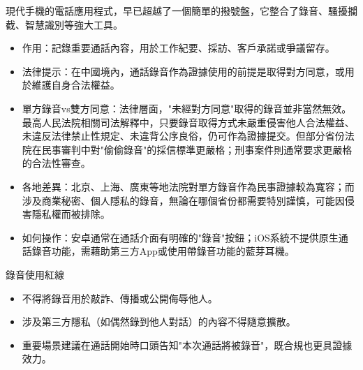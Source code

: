


現代手機的電話應用程式，早已超越了一個簡單的撥號盤，它整合了錄音、騷擾攔截、智慧識別等強大工具。


\begin{itemize}
  \item 作用：記錄重要通話內容，用於工作紀要、採訪、客戶承諾或爭議留存。
  \item 法律提示：在中國境內，通話錄音作為證據使用的前提是取得對方同意，或用於維護自身合法權益。
  \item 單方錄音vs雙方同意：法律層面，"未經對方同意"取得的錄音並非當然無效。最高人民法院相關司法解釋中，只要錄音取得方式未嚴重侵害他人合法權益、未違反法律禁止性規定、未違背公序良俗，仍可作為證據提交。但部分省份法院在民事審判中對"偷偷錄音"的採信標準更嚴格；刑事案件則通常要求更嚴格的合法性審查。
  \item 各地差異：北京、上海、廣東等地法院對單方錄音作為民事證據較為寬容；而涉及商業秘密、個人隱私的錄音，無論在哪個省份都需要特別謹慎，可能因侵害隱私權而被排除。
  \item 如何操作：安卓通常在通話介面有明確的"錄音"按鈕；iOS系統不提供原生通話錄音功能，需藉助第三方App或使用帶錄音功能的藍芽耳機。
\end{itemize}

\begin{tcbwarn}{錄音使用紅線}
\begin{itemize}
  \item 不得將錄音用於敲詐、傳播或公開侮辱他人。
  \item 涉及第三方隱私（如偶然錄到他人對話）的內容不得隨意擴散。
  \item 重要場景建議在通話開始時口頭告知"本次通話將被錄音"，既合規也更具證據效力。
\end{itemize}

\end{tcbwarn}



